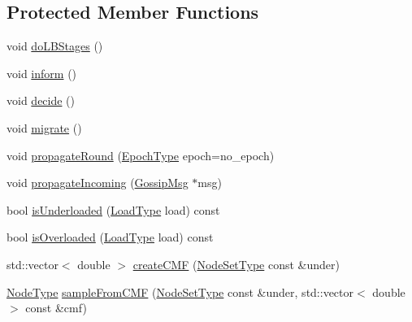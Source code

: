 \subsection*{Protected Member Functions}
\begin{DoxyCompactItemize}
\item 
void \hyperlink{structvt_1_1vrt_1_1collection_1_1lb_1_1_gossip_l_b_af2d00666e6269bb320765b4ca294771d}{do\+L\+B\+Stages} ()
\item 
void \hyperlink{structvt_1_1vrt_1_1collection_1_1lb_1_1_gossip_l_b_afbe0e18095267422ce760573180ac733}{inform} ()
\item 
void \hyperlink{structvt_1_1vrt_1_1collection_1_1lb_1_1_gossip_l_b_a2a990e5bdf182e4705a4ee4082e267a3}{decide} ()
\item 
void \hyperlink{structvt_1_1vrt_1_1collection_1_1lb_1_1_gossip_l_b_ab4ea54ee62ebad9105d79ece61f41b50}{migrate} ()
\item 
void \hyperlink{structvt_1_1vrt_1_1collection_1_1lb_1_1_gossip_l_b_aec4eb4771ea8e0969d8405ae4fb1c309}{propagate\+Round} (\hyperlink{namespacevt_a985a5adf291c34a3ca263b3378388236}{Epoch\+Type} epoch=no\+\_\+epoch)
\item 
void \hyperlink{structvt_1_1vrt_1_1collection_1_1lb_1_1_gossip_l_b_afb935632c8af4efabc3d9a9aa8a5105d}{propagate\+Incoming} (\hyperlink{structvt_1_1vrt_1_1collection_1_1lb_1_1_gossip_l_b_af7170ae946da8af68105109f04824f03}{Gossip\+Msg} $\ast$msg)
\item 
bool \hyperlink{structvt_1_1vrt_1_1collection_1_1lb_1_1_gossip_l_b_a8714236643dcb620aa29956a6ff26b48}{is\+Underloaded} (\hyperlink{structvt_1_1vrt_1_1collection_1_1lb_1_1_base_l_b_a215e22b9f12678303f49615ae3be05cc}{Load\+Type} load) const
\item 
bool \hyperlink{structvt_1_1vrt_1_1collection_1_1lb_1_1_gossip_l_b_a8bbe18748b6dd4b5269e6abfed5c6f99}{is\+Overloaded} (\hyperlink{structvt_1_1vrt_1_1collection_1_1lb_1_1_base_l_b_a215e22b9f12678303f49615ae3be05cc}{Load\+Type} load) const
\item 
std\+::vector$<$ double $>$ \hyperlink{structvt_1_1vrt_1_1collection_1_1lb_1_1_gossip_l_b_abde7527c3d55e4b9114ace8df4d7c0b9}{create\+C\+MF} (\hyperlink{structvt_1_1vrt_1_1collection_1_1lb_1_1_gossip_l_b_abb53f1d4bd3c37f3e68c3b5b0e1f1c86}{Node\+Set\+Type} const \&under)
\item 
\hyperlink{namespacevt_a866da9d0efc19c0a1ce79e9e492f47e2}{Node\+Type} \hyperlink{structvt_1_1vrt_1_1collection_1_1lb_1_1_gossip_l_b_a1a9e88510b1b61a181c9b4dcb3a8c153}{sample\+From\+C\+MF} (\hyperlink{structvt_1_1vrt_1_1collection_1_1lb_1_1_gossip_l_b_abb53f1d4bd3c37f3e68c3b5b0e1f1c86}{Node\+Set\+Type} const \&under, std\+::vector$<$ double $>$ const \&cmf)

\end{DoxyCompactItemize}
